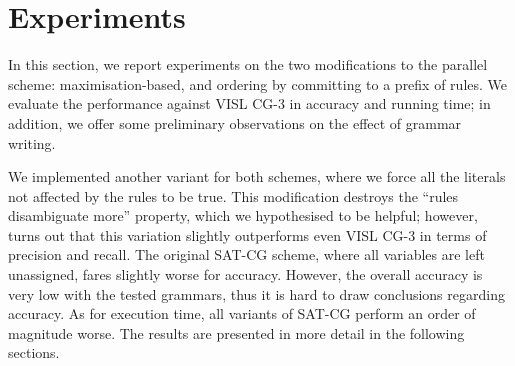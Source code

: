 






\section{Experiments}
\label{sec:eval}

In this section, we report experiments on the two modifications to the parallel scheme: maximisation-based, and ordering by committing to a prefix of rules.
We evaluate the performance against VISL CG-3 in accuracy and running time; in addition, we offer some preliminary observations on the effect of grammar writing.

We implemented another variant for both schemes, where we
force all the literals not affected by the rules to be true.
This modification destroys the ``rules disambiguate more'' property, 
which we hypothesised to be helpful; however, turns out that this variation 
slightly outperforms even VISL CG-3 in terms of precision and recall.
The original SAT-CG scheme, where all variables are left unassigned,
fares slightly worse for accuracy.
However, the overall accuracy is very low with the tested grammars, thus it is hard to draw conclusions regarding accuracy.
As for execution time, all variants of SAT-CG perform an order of magnitude worse.
The results are presented in more detail in the following sections.


